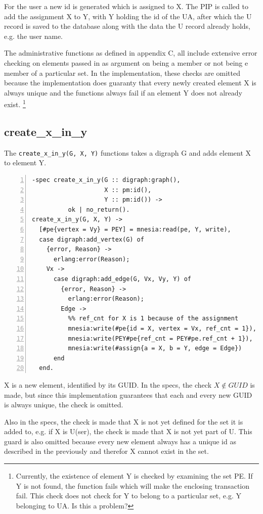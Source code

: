 \documentclass[12pt,a4paper,titlepage]{book}
\begin{document}
	For the user a new id is generated which is assigned to X. The PIP is called to add the assignment X to Y, with Y holding the id of the UA, after which the U record is saved to the database along with the data the U record already holds, e.g. the user name.
		
	The administrative functions as defined in appendix C, all include extensive error checking on elements passed in as argument on being a member or not being e member of a particular set. In the implementation, these checks are omitted because the implementation does guaranty that every newly created element X is always unique and the functions always fail if an element Y does not already exist.	\footnote{Currently, the existence of element Y is checked by examining the set PE. If Y is not found, the function fails which will make the enclosing transaction fail. This check does not check for Y to belong to a particular set, e.g. Y belonging to UA. Is this a problem?}
	
	\subsection{create\_x\_in\_y}
	
		The \lstinline|create_x_in_y(G, X, Y)| functions takes a digraph G and adds element X to element Y.
		
		\begin{lstlisting}[caption={create\_x\_in\_y/3}, basicstyle=\footnotesize, breaklines=false, numbers=left]
-spec create_x_in_y(G :: digraph:graph(),
                    X :: pm:id(),
                    Y :: pm:id()) ->
          ok | no_return().
create_x_in_y(G, X, Y) ->
  [#pe{vertex = Vy} = PEY] = mnesia:read(pe, Y, write),
  case digraph:add_vertex(G) of
    {error, Reason} ->
      erlang:error(Reason);
    Vx ->
      case digraph:add_edge(G, Vx, Vy, Y) of
        {error, Reason} ->
          erlang:error(Reason);
        Edge ->
          %% ref_cnt for X is 1 because of the assignment
          mnesia:write(#pe{id = X, vertex = Vx, ref_cnt = 1}),
          mnesia:write(PEY#pe{ref_cnt = PEY#pe.ref_cnt + 1}),
          mnesia:write(#assign{a = X, b = Y, edge = Edge})
      end
  end. \end{lstlisting}		
	
		X is a new element, identified by its GUID. In the specs, the check $ X \notin GUID $ is made, but since this implementation guarantees that each and every new GUID is always unique, the check is omitted.
	
		Also in the specs, the check is made that X is not yet defined for the set it is added to, e.g. if X is U(ser), the check is made that X is not yet part of U. This guard is also omitted because every new element always has a unique id as described in the previously and therefor X cannot exist in the set.
		
\end{document}
